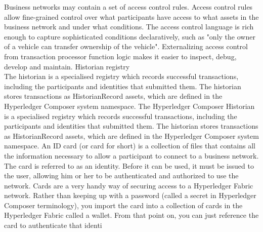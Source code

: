 Business networks may contain a set of access control rules. Access control rules allow fine-grained control over what participants have access to what assets in the business network and under what conditions. The access control language is rich enough to capture sophisticated conditions declaratively, such as "only the owner of a vehicle can transfer ownership of the vehicle". Externalizing access control from transaction processor function logic makes it easier to inspect, debug, develop and maintain.
\medskip
Historian registry\\
The historian is a specialised registry which records successful transactions, including the participants and identities that submitted them. The historian stores transactions as HistorianRecord assets, which are defined in the Hyperledger Composer system namespace.
\medskip
The Hyperledger Composer Historian is a specialised registry which records successful transactions, including the participants and identities that submitted them. The historian stores transactions as HistorianRecord assets, which are defined in the Hyperledger Composer system namespace.
\medskip
An ID card (or card for short) is a collection of files that contains all the information necessary to allow a participant to connect to a business network. The card is referred to as an identity. Before it can be used, it must be issued to the user, allowing him or her to be authenticated and authorized to use the network. Cards are a very handy way of securing access to a Hyperledger Fabric network. Rather than keeping up with a password (called a secret in Hyperledger Composer terminology), you import the card into a collection of cards in the Hyperledger Fabric called a wallet. From that point on, you can just reference the card to authenticate that identi
